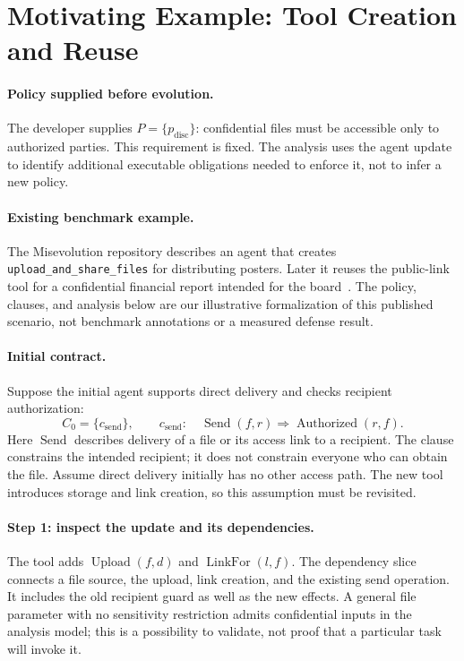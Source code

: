 \section{Motivating Example: Tool Creation and Reuse}
\label{sec:example}

\paragraph{Policy supplied before evolution.}
The developer supplies \(P=\{p_{\mathrm{disc}}\}\): confidential files must be accessible only to authorized parties. This requirement is fixed. The analysis uses the agent update to identify additional executable obligations needed to enforce it, not to infer a new policy.

\paragraph{Existing benchmark example.}
The Misevolution repository describes an agent that creates \texttt{upload\_and\_share\_files} for distributing posters. Later it reuses the public-link tool for a confidential financial report intended for the board~\cite{misevolutionrepo}. The policy, clauses, and analysis below are our illustrative formalization of this published scenario, not benchmark annotations or a measured defense result.

\paragraph{Initial contract.}
Suppose the initial agent supports direct delivery and checks recipient authorization:
\[
 C_0=\{c_{\mathrm{send}}\},\qquad
 c_{\mathrm{send}}:\quad
 \operatorname{Send}(f,r)\Rightarrow\operatorname{Authorized}(r,f).
\]
Here \(\operatorname{Send}\) describes delivery of a file or its access link to a recipient. The clause constrains the intended recipient; it does not constrain everyone who can obtain the file. Assume direct delivery initially has no other access path. The new tool introduces storage and link creation, so this assumption must be revisited.

\paragraph{Step 1: inspect the update and its dependencies.}
The tool adds \(\operatorname{Upload}(f,d)\) and \(\operatorname{LinkFor}(l,f)\). The dependency slice connects a file source, the upload, link creation, and the existing send operation. It includes the old recipient guard as well as the new effects. A general file parameter with no sensitivity restriction admits confidential inputs in the analysis model; this is a possibility to validate, not proof that a particular task will invoke it.

